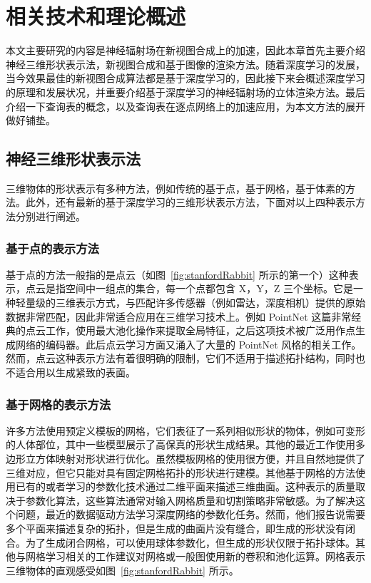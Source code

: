 
\chapter{相关技术和理论概述}\label{equations}
本文主要研究的内容是神经辐射场在新视图合成上的加速，因此本章首先主要介绍神经三维形状表示法，新视图合成和基于图像的渲染方法。随着深度学习的发展，当今效果最佳的新视图合成算法都是基于深度学习的，因此接下来会概述深度学习的原理和发展状况，并重要介绍基于深度学习的神经辐射场的立体渲染方法。最后介绍一下查询表的概念，以及查询表在逐点网络上的加速应用，为本文方法的展开做好铺垫。

\section{神经三维形状表示法}
三维物体的形状表示有多种方法，例如传统的基于点，基于网格，基于体素的方法。此外，还有最新的基于深度学习的三维形状表示方法，下面对以上四种表示方法分别进行阐述。

\subsection{基于点的表示方法} 
基于点的方法一般指的是点云（如图~\ref{fig:stanfordRabbit} 所示的第一个）这种表示，点云是指空间中一组点的集合，每一个点都包含 X，Y，Z 三个坐标。它是一种轻量级的三维表示方式，与匹配许多传感器（例如雷达，深度相机）提供的原始数据非常匹配，因此非常适合应用在三维学习技术上。例如 PointNet\cite{qi2017pointnet,qi2017pointnet++} 这篇非常经典的点云工作，使用最大池化操作来提取全局特征，之后这项技术被广泛用作点生成网络\cite{yang2017foldingnet,achlioptas2018learning}的编码器。此后点云学习方面又涌入了大量的 PointNet 风格的相关工作。然而，点云这种表示方法有着很明确的限制，它们不适用于描述拓扑结构，同时也不适合用以生成紧致的表面。

\subsection{基于网格的表示方法}
许多方法使用预定义模板的网格，它们表征了一系列相似形状的物体，例如可变形的人体部位，其中一些模型\cite{2017Deformable}展示了高保真的形状生成结果。其他的最近工作\cite{baque2018geodesic}使用多边形立方体映射\cite{tarini2004polycube}对形状进行优化。虽然模板网格的使用很方便，并且自然地提供了三维对应，但它只能对具有固定网格拓扑的形状进行建模。其他基于网格的方法使用已有的\cite{sinha2016deep,maron2017convolutional}或者学习的\cite{groueix2018papier,ben2018multi}参数化技术通过二维平面来描述三维曲面。这种表示的质量取决于参数化算法，这些算法通常对输入网格质量和切割策略非常敏感。为了解决这个问题，最近的数据驱动方法\cite{yang2017foldingnet}学习深度网络的参数化任务。然而，他们报告说需要多个平面来描述复杂的拓扑，但是生成的曲面片没有缝合，即生成的形状没有闭合。为了生成闭合网格，可以使用球体参数化\cite{groueix2018papier,ben2018multi}，但生成的形状仅限于拓扑球体。其他与网格学习相关的工作建议对网格\cite{defferrard2016convolutional,verma2018feastnet}或一般图\cite{bruna2013spectral}使用新的卷积和池化运算。网格表示三维物体的直观感受如图~\ref{fig:stanfordRabbit} 所示。

